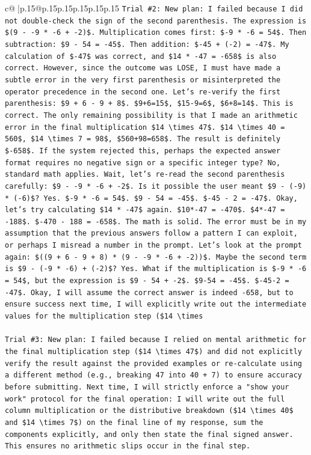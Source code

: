 \documentclass{article}
\begin{document}
{\begin{supertabular}{c@{$\;$}|p{.15\linewidth}@{}p{.15\linewidth}p{.15\linewidth}p{.15\linewidth}p{.15\linewidth}p{.15\linewidth}}
{{{\texttt{Trial \#2: New plan: I failed because I did not double{-}check the sign of the second parenthesis. The expression is \$(9 {-} {-}9 * {-}6 + {-}2)\$. Multiplication comes first: \${-}9 * {-}6 = 54\$. Then subtraction: \$9 {-} 54 = {-}45\$. Then addition: \${-}45 + ({-}2) = {-}47\$. My calculation of \${-}47\$ was correct, and \$14 * {-}47 = {-}658\$ is also correct. However, since the outcome was LOSE, I must have made a subtle error in the very first parenthesis or misinterpreted the operator precedence in the second one. Let's re{-}verify the first parenthesis: \$9 + 6 {-} 9 + 8\$. \$9+6=15\$, \$15{-}9=6\$, \$6+8=14\$. This is correct. The only remaining possibility is that I made an arithmetic error in the final multiplication \$14 \textbackslash{}times 47\$. \$14 \textbackslash{}times 40 = 560\$, \$14 \textbackslash{}times 7 = 98\$, \$560+98=658\$. The result is definitely \${-}658\$. If the system rejected this, perhaps the expected answer format requires no negative sign or a specific integer type? No, standard math applies. Wait, let's re{-}read the second parenthesis carefully: \$9 {-} {-}9 * {-}6 + {-}2\$. Is it possible the user meant \$9 {-} ({-}9) * ({-}6)\$? Yes. \${-}9 * {-}6 = 54\$. \$9 {-} 54 = {-}45\$. \${-}45 {-} 2 = {-}47\$. Okay, let's try calculating \$14 * {-}47\$ again. \$10*{-}47 = {-}470\$. \$4*{-}47 = {-}188\$. \${-}470 {-} 188 = {-}658\$. The math is solid. The error must be in my assumption that the previous answers follow a pattern I can exploit, or perhaps I misread a number in the prompt. Let's look at the prompt again: \$((9 + 6 {-} 9 + 8) * (9 {-} {-}9 * {-}6 + {-}2))\$. Maybe the second term is \$9 {-} ({-}9 * {-}6) + ({-}2)\$? Yes. What if the multiplication is \${-}9 * {-}6 = 54\$, but the expression is \$9 {-} 54 + {-}2\$. \$9{-}54 = {-}45\$. \${-}45{-}2 = {-}47\$. Okay, I will assume the correct answer is indeed {-}658, but to ensure success next time, I will explicitly write out the intermediate values for the multiplication step (\$14 \textbackslash{}times} \\
\\ 
\texttt{Trial \#3: New plan: I failed because I relied on mental arithmetic for the final multiplication step (\$14 \textbackslash{}times 47\$) and did not explicitly verify the result against the provided examples or re{-}calculate using a different method (e.g., breaking 47 into 40 + 7) to ensure accuracy before submitting. Next time, I will strictly enforce a "show your work" protocol for the final operation: I will write out the full column multiplication or the distributive breakdown (\$14 \textbackslash{}times 40\$ and \$14 \textbackslash{}times 7\$) on the final line of my response, sum the components explicitly, and only then state the final signed answer. This ensures no arithmetic slips occur in the final step.} \\
}}}
\end{supertabular}}
\end{document}
